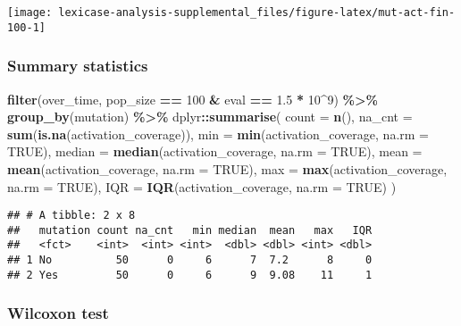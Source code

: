 \documentclass[
]{book}
\newenvironment{Shaded}{\begin{snugshade}}{\end{snugshade}}
\newcommand{\AttributeTok}[1]{\textcolor[rgb]{0.13,0.29,0.53}{#1}}
\newcommand{\ConstantTok}[1]{\textcolor[rgb]{0.56,0.35,0.01}{#1}}
\newcommand{\DecValTok}[1]{\textcolor[rgb]{0.00,0.00,0.81}{#1}}
\newcommand{\FloatTok}[1]{\textcolor[rgb]{0.00,0.00,0.81}{#1}}
\newcommand{\FunctionTok}[1]{\textcolor[rgb]{0.13,0.29,0.53}{\textbf{#1}}}
\newcommand{\NormalTok}[1]{#1}
\newcommand{\SpecialCharTok}[1]{\textcolor[rgb]{0.81,0.36,0.00}{\textbf{#1}}}
\begin{document}
\texttt{[image: lexicase-analysis-supplemental\_files/figure-latex/mut-act-fin-100-1]}

\hypertarget{summary-statistics-3}{%
\subsubsection{Summary statistics}\label{summary-statistics-3}}

\begin{Shaded}
\begin{Highlighting}[]
\FunctionTok{filter}\NormalTok{(over\_time, pop\_size }\SpecialCharTok{==} \DecValTok{100} \SpecialCharTok{\&}\NormalTok{ eval }\SpecialCharTok{==} \FloatTok{1.5} \SpecialCharTok{*} \DecValTok{10}\SpecialCharTok{\^{}}\DecValTok{9}\NormalTok{) }\SpecialCharTok{\%\textgreater{}\%}
  \FunctionTok{group\_by}\NormalTok{(mutation) }\SpecialCharTok{\%\textgreater{}\%}
\NormalTok{  dplyr}\SpecialCharTok{::}\FunctionTok{summarise}\NormalTok{(}
    \AttributeTok{count =} \FunctionTok{n}\NormalTok{(),}
    \AttributeTok{na\_cnt =} \FunctionTok{sum}\NormalTok{(}\FunctionTok{is.na}\NormalTok{(activation\_coverage)),}
    \AttributeTok{min =} \FunctionTok{min}\NormalTok{(activation\_coverage, }\AttributeTok{na.rm =} \ConstantTok{TRUE}\NormalTok{),}
    \AttributeTok{median =} \FunctionTok{median}\NormalTok{(activation\_coverage, }\AttributeTok{na.rm =} \ConstantTok{TRUE}\NormalTok{),}
    \AttributeTok{mean =} \FunctionTok{mean}\NormalTok{(activation\_coverage, }\AttributeTok{na.rm =} \ConstantTok{TRUE}\NormalTok{),}
    \AttributeTok{max =} \FunctionTok{max}\NormalTok{(activation\_coverage, }\AttributeTok{na.rm =} \ConstantTok{TRUE}\NormalTok{),}
    \AttributeTok{IQR =} \FunctionTok{IQR}\NormalTok{(activation\_coverage, }\AttributeTok{na.rm =} \ConstantTok{TRUE}\NormalTok{)}
\NormalTok{  )}
\end{Highlighting}
\end{Shaded}

\begin{verbatim}
## # A tibble: 2 x 8
##   mutation count na_cnt   min median  mean   max   IQR
##   <fct>    <int>  <int> <int>  <dbl> <dbl> <int> <dbl>
## 1 No          50      0     6      7  7.2      8     0
## 2 Yes         50      0     6      9  9.08    11     1
\end{verbatim}

\hypertarget{wilcoxon-test}{%
\subsubsection{Wilcoxon test}\label{wilcoxon-test}}
\end{document}
